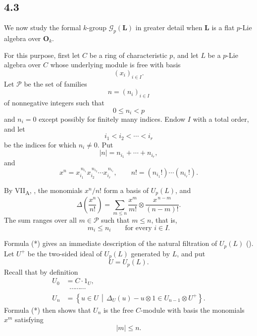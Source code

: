 
\subsection*{4.3}
\label{sga3:VIIB:4.3}

We now study the formal \(k\)-group \(\mathscr G_p(\mathbf L)\) in
greater detail when \(\mathbf L\) is a flat \(p\)-Lie algebra over
\(\mathbf O_k\).

For this purpose, first let \(C\) be a ring of characteristic
\(p\), and let \(L\) be a \(p\)-Lie algebra over \(C\) whose
underlying module is free with basis
\[
  (x_i)_{i\in I}.
\]
Let \(\mathcal P\) be the set of families
\[
  n=(n_i)_{i\in I}
\]
of nonnegative integers such that
\[
  0\leq n_i<p
\]
and \(n_i=0\) except possibly for finitely many indices. Endow
\(I\) with a total order, and let
\[
  i_1<i_2<\cdots<i_r
\]
be the indices for which \(n_i\ne0\). Put
\[
  |n|=n_{i_1}+\cdots+n_{i_r},
\]
and
\[
  x^n
  =
  x_{i_1}^{\,n_{i_1}}
  x_{i_2}^{\,n_{i_2}}
  \cdots
  x_{i_r}^{\,n_{i_r}},
  \qquad
  n!
  =
  (n_{i_1}!)\cdots(n_{i_r}!).
\]

By VII\textsubscript{A}, , the monomials \(x^n/n!\) form a
basis of \(U_p(L)\), and
\begin{equation}
  \Delta\left(\frac{x^n}{n!}\right)
  =
  \sum_{m\leq n}
  \frac{x^m}{m!}
  \otimes
  \frac{x^{\,n-m}}{(n-m)!}.
  \tag{*}
  \label{sga3:VIIB:4.3:restricted-pbw-comultiplication}
\end{equation}
The sum ranges over all \(m\in\mathcal P\) such that \(m\leq n\),
that is,
\[
  m_i\leq n_i
  \qquad\text{for every }i\in I.
\]

Formula \textup{(*)} gives an immediate description of the natural
filtration of \(U_p(L)\) \textup{()}. Let \(U^+\) be the
two-sided ideal of \(U_p(L)\) generated by \(L\), and put
\[
  U=U_p(L).
\]
Recall that by definition
\[
\begin{aligned}
  U_0&=C\cdot1_U,
  \\
  &\;\;\cdots\cdots\cdots
  \\
  U_n
  &=
  \left\{
    u\in U
    \,\middle|\,
    \Delta_U(u)-u\otimes1
    \in U_{n-1}\otimes U^+
  \right\}.
\end{aligned}
\]
Formula \textup{(*)} then shows that \(U_n\) is the free
\(C\)-module with basis the monomials \(x^m\) satisfying
\[
  |m|\leq n.
\]

